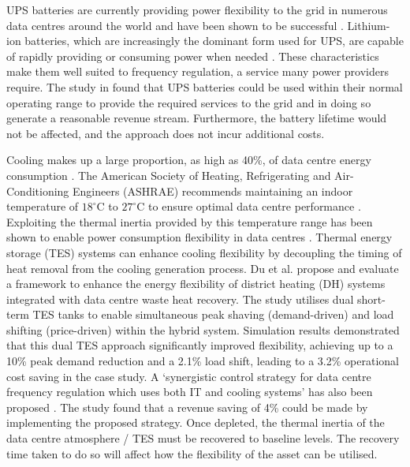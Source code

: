 \documentclass[lettersize,journal]{IEEEtran}
\providecommand{\DIFadd}[1]{{\color{blue}#1}}
\providecommand{\DIFaddbegin}{}
\providecommand{\DIFaddend}{}
\begin{document}
UPS batteries are currently providing power flexibility to the grid in numerous  \DIFaddbegin \DIFadd{data centres }\DIFaddend around the world and have been shown to be successful \cite{alapera2019fast,roach2022microsoft,Anghel_2023}. Lithium-ion batteries, which are increasingly the dominant form used for UPS, are capable of rapidly providing or consuming power when needed \cite{alapera2018data}. These characteristics make them well suited to frequency regulation, a service many power providers require.  \DIFaddbegin \DIFadd{The study in \cite{alapera2018data} found that }\DIFaddend UPS batteries could be used within their normal operating range to provide the required services to the grid and in doing so generate a reasonable revenue stream. Furthermore, the battery lifetime would not be affected, and the approach does not  \DIFaddbegin \DIFadd{incur additional costs}\DIFaddend .

Cooling makes up a large proportion, as high as 40\%, of  \DIFaddbegin \DIFadd{data centre }\DIFaddend energy consumption \cite{zhao2021synthetic}. The American Society of Heating, Refrigerating and Air-Conditioning Engineers (ASHRAE) recommends maintaining an indoor temperature of $18^\circ\mathrm{C}$ to $27^\circ\mathrm{C}$ to ensure optimal  \DIFaddbegin \DIFadd{data centre }\DIFaddend performance \cite{tc2016data}. Exploiting the thermal inertia provided by this temperature range has been shown to enable power consumption flexibility in  \DIFaddbegin \DIFadd{data centres \cite{takci2025data,ref22}. Thermal energy storage }\DIFaddend (TES) systems can enhance cooling flexibility by decoupling the timing of heat removal from the cooling generation process.
Du et al. \cite{du2025new} propose and evaluate a framework to enhance the energy flexibility of district heating (DH) systems integrated with  \DIFaddbegin \DIFadd{data centre }\DIFaddend waste heat recovery. The study utilises dual short-term TES tanks to enable simultaneous peak shaving (demand-driven) and load shifting (price-driven) within the hybrid system. Simulation results demonstrated that this dual TES approach significantly improved flexibility, achieving up to a 10\% peak demand reduction and a 2.1\% load shift, leading to a 3.2\% operational cost saving in the case study. A `synergistic control strategy for data centre frequency regulation which uses both IT and cooling systems' has also been proposed  \DIFaddbegin \DIFadd{\cite{Fu2020ApEn}. The study }\DIFaddend found that a revenue saving of 4\% could be made by implementing the proposed strategy. Once depleted, the thermal inertia of the  \DIFaddbegin \DIFadd{data centre }\DIFaddend atmosphere / TES must be recovered to baseline levels. The recovery time taken to do so will affect how the flexibility of the asset can be utilised.
\end{document}
